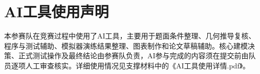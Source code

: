 \section*{AI工具使用声明}

\noindent 本参赛队在竞赛过程中使用了AI工具，主要用于题面条件整理、几何推导复核、程序与测试辅助、模拟器演练结果整理、图表制作和论文草稿辅助。核心建模决策、正式测试操作及最终结论由参赛队负责，AI参与完成的内容须在提交前由队员逐项人工审查核实。详细使用情况见支撑材料中的《AI工具使用详情.pdf》。
